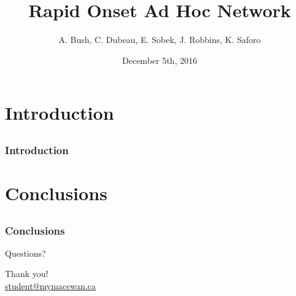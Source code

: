\documentclass[compress]{beamer}
\title[Short Title]{Rapid Onset Ad Hoc Network}
\author[Short Author Names]{
  A. Bush,
  C. Dubeau,
  E. Sobek,
  J. Robbins,
  K. Saforo
}
\date{December 5th, 2016}
\institute{\vspace{0.2em}
  \texttt{[image: macewan]}\\[0.25em]
}
\begin{document}


\section{Introduction}
\subsection*{}

\begin{frame}[t]
  \frametitle{Introduction}

\end{frame}








\section{Conclusions}
\subsection*{}


\begin{frame}[t]
  \frametitle{Conclusions}

  Questions?
  
  \vfill

  \begin{center}
    Thank you!\\
    \url{student@mymacewan.ca}
  \end{center}

  \vfill
\end{frame}
\end{document}
